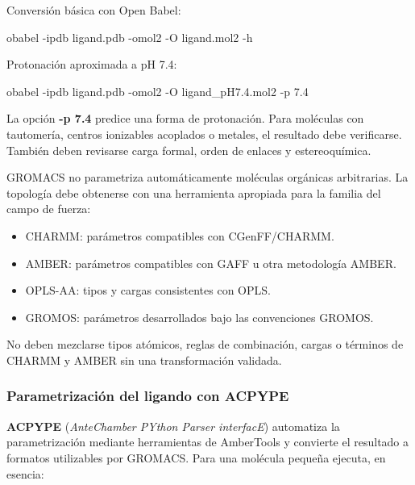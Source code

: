 \documentclass[
  spanish,
  11pt,
  a4paper]{article}
\newenvironment{Shaded}{\begin{snugshade}}{\end{snugshade}}
\newcommand{\AttributeTok}[1]{\textcolor[rgb]{0.13,0.29,0.53}{#1}}
\newcommand{\ExtensionTok}[1]{#1}
\newcommand{\NormalTok}[1]{#1}
\providecommand{\tightlist}{%
  \setlength{\itemsep}{0pt}\setlength{\parskip}{0pt}}
\begin{document}
Conversión básica con Open Babel:

\begin{Shaded}
\begin{Highlighting}[]
\ExtensionTok{obabel} \AttributeTok{{-}ipdb}\NormalTok{ ligand.pdb }\AttributeTok{{-}omol2} \AttributeTok{{-}O}\NormalTok{ ligand.mol2 }\AttributeTok{{-}h}
\end{Highlighting}
\end{Shaded}

Protonación aproximada a pH 7.4:

\begin{Shaded}
\begin{Highlighting}[]
\ExtensionTok{obabel} \AttributeTok{{-}ipdb}\NormalTok{ ligand.pdb }\AttributeTok{{-}omol2} \AttributeTok{{-}O}\NormalTok{ ligand\_pH7.4.mol2 }\AttributeTok{{-}p}\NormalTok{ 7.4}
\end{Highlighting}
\end{Shaded}

La opción \textbf{-p 7.4} predice una forma de protonación. Para
moléculas con tautomería, centros ionizables acoplados o metales, el
resultado debe verificarse. También deben revisarse carga formal, orden
de enlaces y estereoquímica.

GROMACS no parametriza automáticamente moléculas orgánicas arbitrarias.
La topología debe obtenerse con una herramienta apropiada para la
familia del campo de fuerza:

\begin{itemize}
\tightlist
\item
  CHARMM: parámetros compatibles con CGenFF/CHARMM.
\item
  AMBER: parámetros compatibles con GAFF u otra metodología AMBER.
\item
  OPLS-AA: tipos y cargas consistentes con OPLS.
\item
  GROMOS: parámetros desarrollados bajo las convenciones GROMOS.
\end{itemize}

No deben mezclarse tipos atómicos, reglas de combinación, cargas o
términos de CHARMM y AMBER sin una transformación validada.

\subsubsection{Parametrización del ligando con
ACPYPE}\label{parametrizaciuxf3n-del-ligando-con-acpype}

\textbf{ACPYPE} (\emph{AnteChamber PYthon Parser interfacE}) automatiza
la parametrización mediante herramientas de AmberTools y convierte el
resultado a formatos utilizables por GROMACS. Para una molécula pequeña
ejecuta, en esencia:
\end{document}
